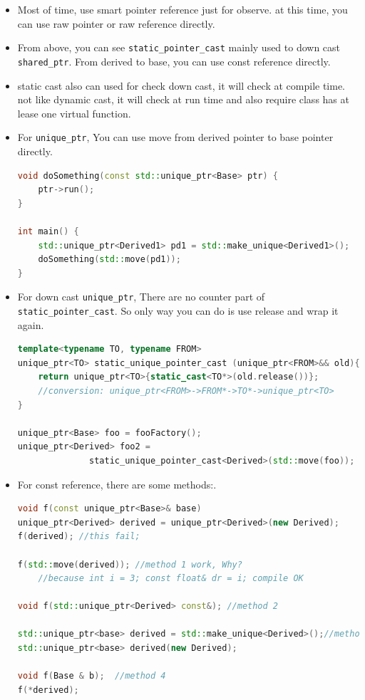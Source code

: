 \documentclass[a4paper,11pt,twoside]{book}
\begin{document}
\begin{itemize}
\item Most of time, use smart pointer reference just for observe. at this time, you can use raw pointer or raw reference directly. 

\item From above, you can see \texttt{static\_pointer\_cast} mainly used to down cast \texttt{shared\_ptr}. From derived to base, you can use const reference directly.

\item static cast also can used for check down cast, it will check at compile time. not like dynamic cast, it will check at run time and also require class has at lease one virtual function.


\item For \texttt{unique\_ptr}, You can use move from derived pointer to base pointer directly.
\begin{lstlisting}[frame=single, language=c++, mathescape=true]
void doSomething(const std::unique_ptr<Base> ptr) {
    ptr->run();
}

int main() {
    std::unique_ptr<Derived1> pd1 = std::make_unique<Derived1>();
    doSomething(std::move(pd1));
}
\end{lstlisting}

\item For down cast \texttt{unique\_ptr}, There are no counter part of \texttt{static\_pointer\_cast}. So only way you can do is use release and wrap it again.

\begin{lstlisting}[frame=single, language=c++, mathescape=true]
template<typename TO, typename FROM>
unique_ptr<TO> static_unique_pointer_cast (unique_ptr<FROM>&& old){
	return unique_ptr<TO>{static_cast<TO*>(old.release())};
	//conversion: unique_ptr<FROM>->FROM*->TO*->unique_ptr<TO>
}

unique_ptr<Base> foo = fooFactory();
unique_ptr<Derived> foo2 = 
              static_unique_pointer_cast<Derived>(std::move(foo));
\end{lstlisting}

\item For const reference, there are some methods:.
\begin{lstlisting}[frame=single, language=c++, mathescape=true]
void f(const unique_ptr<Base>& base)
unique_ptr<Derived> derived = unique_ptr<Derived>(new Derived);
f(derived); //this fail;

f(std::move(derived)); //method 1 work, Why?
    //because int i = 3; const float& dr = i; compile OK
                       
void f(std::unique_ptr<Derived> const&); //method 2

std::unique_ptr<base> derived = std::make_unique<Derived>();//method 3 
std::unique_ptr<base> derived(new Derived);

void f(Base & b);  //method 4
f(*derived);
\end{lstlisting}

\end{itemize}
\end{document}
